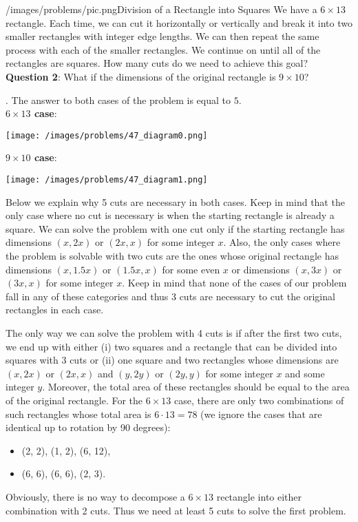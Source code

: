 \begin{problem}{/images/problems/pic.png}{Division of a Rectangle into Squares}
	We have a $6 \times 13$ rectangle. Each time, we can cut it horizontally or vertically and break it into two smaller rectangles with integer edge lengths. We can then repeat the same process with each of the smaller rectangles. We continue on until all of the rectangles are squares. How many cuts do we need to achieve this goal?\\[0.2cm]
	
\textbf{Question 2}: What if the dimensions of the original rectangle is $9 \times 10$?
\end{problem}
\begin{solution}.
The answer to both cases of the problem is equal to $5$.\\[0.2cm]
\noindent \textbf{$6 \times 13$ case}: 
\begin{center}
	\texttt{[image: /images/problems/47\_diagram0.png]}
\end{center}
\noindent \textbf{$9 \times 10$ case}: 
\begin{center}
	\texttt{[image: /images/problems/47\_diagram1.png]}
\end{center}
Below we explain why 5 cuts are necessary in both cases. Keep in mind that the only case where no cut is necessary is when the starting rectangle is already a square. We can solve the problem with one cut only if the starting rectangle has dimensions $(x,2x)$ or $(2x,x)$ for some integer $x$. Also, the only cases where the problem is solvable with two cuts are the ones whose original rectangle has dimensions $(x,1.5x)$ or $(1.5x, x)$ for some even $x$ or dimensions $(x,3x)$ or $(3x,x)$ for some integer $x$. Keep in mind that none of the cases of our problem fall in any of these categories and thus 3 cuts are necessary to cut the original rectangles in each case.

The only way we can solve the problem with 4 cuts is if after the first two cuts, we end up with either (i) two squares and a rectangle that can be divided into squares with 3 cuts or (ii) one square and two rectangles whose dimensions are $(x,2x)$ or $(2x,x)$ and $(y,2y)$ or $(2y,y)$ for some integer $x$ and some integer $y$. Moreover, the total area of these rectangles should be equal to the area of the original rectangle. For the $6 \times 13$ case, there are only two combinations of such rectangles whose total area is $6\cdot 13 = 78$ (we ignore the cases that are identical up to rotation by 90 degrees):
\begin{itemize}
	\item (2, 2), (1, 2), (6, 12),
	\item (6, 6), (6, 6), (2, 3).
\end{itemize} 
Obviously, there is no way to decompose a $6 \times 13$ rectangle into either combination with 2 cuts. Thus we need at least 5 cuts to solve the first problem.


\end{solution}
